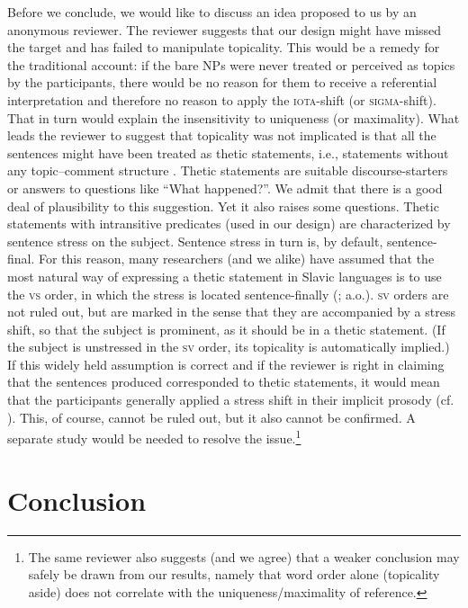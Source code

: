 \documentclass[output=paper]{langscibook}
\begin{document}
Before we conclude, we would like to discuss an idea proposed to us by an anonymous reviewer. The reviewer suggests that our design might have missed the target and has failed to manipulate topicality. This would be a remedy for the traditional account: if the bare NPs were never treated or perceived as topics by the participants, there would be no reason for them to receive a referential interpretation and therefore no reason to apply the \textsc{iota}-shift (or \textsc{sigma}-shift). That in turn would explain the insensitivity to uniqueness (or maximality). What leads the reviewer to suggest that topicality was not implicated is that all the sentences might have been treated as thetic statements, i.e., statements without any topic--comment structure \citep{Sasse1987}. Thetic statements are suitable discourse-starters or answers to questions like ``What happened?''. We admit that there is a good deal of plausibility to this suggestion. Yet it also raises some questions. Thetic statements with intransitive predicates (used in our design) are characterized by sentence stress on the subject. Sentence stress in turn is, by default, sentence-final. For this reason, many researchers (and we alike) have assumed that the most natural way of expressing a thetic statement in Slavic languages is to use the \textsc{vs} order, in which the stress is located sentence-finally (\citealt{Junghanns2002Thetisch,Geist2010}; a.o.). \textsc{sv} orders are not ruled out, but are marked in the sense that they are accompanied by a stress shift, so that the subject is prominent, as it should be in a thetic statement. (If the subject is unstressed in the \textsc{sv} order, its topicality is automatically implied.) If this widely held assumption is correct and if the reviewer is right in claiming that the sentences produced corresponded to thetic statements, it would mean that the participants generally applied a stress shift in their implicit prosody (cf. \citealt{Fodor2002}). This, of course, cannot be ruled out, but it also cannot be confirmed. A separate study would be needed to resolve the issue.\footnote{The same reviewer also suggests (and we agree) that a weaker conclusion may safely be drawn from our results, namely that word order alone (topicality aside) does not correlate with the uniqueness/maximality of reference.\label{sim-dem:fn:thetic}}

\section{Conclusion}\label{sim-dem:sec:concl}
\end{document}
